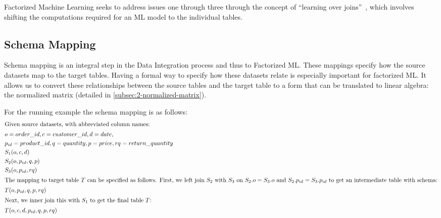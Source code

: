 Factorized Machine Learning seeks to address issues one through three through the concept of ``learning over joins''~\cite{orion_learning_gen_lin_models}, which involves shifting the computations required for an ML model to the individual tables.

\subsection{Schema Mapping}
Schema mapping is an integral step in the Data Integration process and thus to Factorized ML. These mappings specify how the source datasets map to the target tables. Having a formal way to specify how these datasets relate is especially important for factorized ML. It allows us to convert these relationships between the source tables and the target table to a form that can be translated to linear algebra: the normalized matrix (detailed in \autoref{subsec:2-normalized-matrix}).

For the running example the schema mapping is as follows:
\begin{alignat*}{2}
  \intertext{Given source datasets, with abbreviated column names:}
   & o=order\_id, c=customer\_id, d=date,                           \\
   & p_{id}=product\_id, q=quantity, p=price, rq=return\_quantity   \\
   & S_1(o, c, d)                                                   \\
   & S_2(o, p_{id} , q,  p)                                         \\
   & S_3(o, p_{id}, rq)                                           & \\
  \intertext{The mapping to target table $T$ can be specified as follows. First, we left join $S_2$ with $S_3$ on $S_{2}.o=S_{3}.o$ and $S_{2}.p_{id}=S_{3}.p_{id}$ to get an intermediate table with schema:}
   & T(o, p_{id}, q, p, rq)                                         \\
  \intertext{Next, we inner join this with $S_1$ to get the final table $T$:}
   & T(o, c, d, p_{id}, q, p, rq)                                   \\
\end{alignat*}


